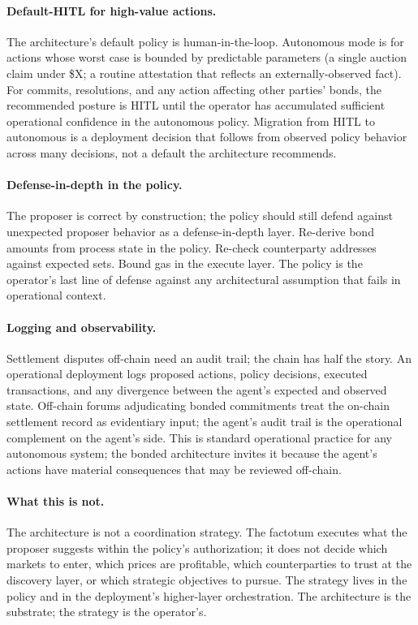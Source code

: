 \documentclass[11pt,a4paper]{article}
\theoremstyle{definition}
\theoremstyle{remark}
\begin{document}
\paragraph{Default-HITL for high-value actions.}
The architecture's default policy is human-in-the-loop. Autonomous
mode is for actions whose worst case is bounded by predictable
parameters (a single auction claim under \$X; a routine attestation
that reflects an externally-observed fact). For commits, resolutions,
and any action affecting other parties' bonds, the recommended
posture is HITL until the operator has accumulated sufficient
operational confidence in the autonomous policy. Migration from HITL
to autonomous is a deployment decision that follows from observed
policy behavior across many decisions, not a default the architecture
recommends.

\paragraph{Defense-in-depth in the policy.}
The proposer is correct by construction; the policy should still
defend against unexpected proposer behavior as a defense-in-depth
layer. Re-derive bond amounts from process state in the policy. Re-check
counterparty addresses against expected sets. Bound gas in the
execute layer. The policy is the operator's last line of defense
against any architectural assumption that fails in operational
context.

\paragraph{Logging and observability.}
Settlement disputes off-chain need an audit trail; the chain has
half the story. An operational deployment logs proposed actions,
policy decisions, executed transactions, and any divergence between
the agent's expected and observed state. Off-chain forums
adjudicating bonded commitments treat the on-chain settlement
record as evidentiary input; the agent's audit trail is the
operational complement on the agent's side. This is
standard operational practice for any autonomous system; the
bonded architecture invites it because the agent's actions have
material consequences that may be reviewed off-chain.

\paragraph{What this is not.}
The architecture is not a coordination strategy. The factotum
executes what the proposer suggests within the policy's authorization;
it does not decide which markets to enter, which prices are
profitable, which counterparties to trust at the discovery layer,
or which strategic objectives to pursue. The strategy lives in
the policy and in the deployment's higher-layer orchestration. The
architecture is the substrate; the strategy is the operator's.
\end{document}
